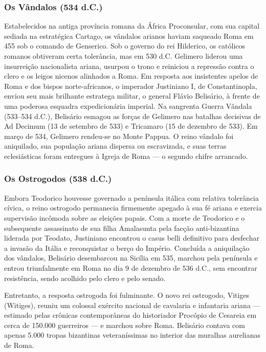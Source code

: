 \documentclass[11pt,a4paper,openany]{book}
\begin{document}
\subsubsection*{Os Vândalos (534 d.C.)}
Estabelecidos na antiga província romana da África Proconsular, com sua capital sediada na estratégica Cartago, os vândalos arianos haviam saqueado Roma em 455 sob o comando de Genserico. Sob o governo do rei Hilderico, os católicos romanos obtiveram certa tolerância, mas em 530 d.C. Gelimero liderou uma insurreição nacionalista ariana, usurpou o trono e reiniciou a repressão contra o clero e os leigos nicenos alinhados a Roma. Em resposta aos insistentes apelos de Roma e dos bispos norte-africanos, o imperador Justiniano I, de Constantinopla, enviou seu mais brilhante estratega militar, o general Flávio Belisário, à frente de uma poderosa esquadra expedicionária imperial. Na sangrenta Guerra Vândala (533–534 d.C.), Belisário esmagou as forças de Gelimero nas batalhas decisivas de Ad Decimum (13 de setembro de 533) e Tricamaro (15 de dezembro de 533). Em março de 534, Gelimero rendeu-se no Monte Pappua. O reino vândalo foi aniquilado, sua população ariana dispersa ou escravizada, e suas terras eclesiásticas foram entregues à Igreja de Roma — o segundo chifre arrancado.


\subsubsection*{Os Ostrogodos (538 d.C.)}
Embora Teodorico houvesse governado a península itálica com relativa tolerância cívica, o reino ostrogodo permanecia firmemente apegado à sua fé ariana e exercia supervisão incômoda sobre as eleições papais. Com a morte de Teodorico e o subsequente assassinato de sua filha Amalasunta pela facção anti-bizantina liderada por Teodato, Justiniano encontrou o casus belli definitivo para desfechar a invasão da Itália e reconquistar o berço do Império. Concluída a aniquilação dos vândalos, Belisário desembarcou na Sicília em 535, marchou pela península e entrou triunfalmente em Roma no dia 9 de dezembro de 536 d.C., sem encontrar resistência, sendo acolhido pelo clero e pelo senado.

Entretanto, a resposta ostrogoda foi fulminante. O novo rei ostrogodo, Vitiges (Witiges), reuniu um colossal exército nacional de cavalaria e infantaria ariana — estimado pelas crônicas contemporâneas do historiador Procópio de Cesareia em cerca de 150.000 guerreiros — e marchou sobre Roma. Belisário contava com apenas 5.000 tropas bizantinas veteraníssimas no interior das muralhas aurelianas de Roma.
\end{document}
